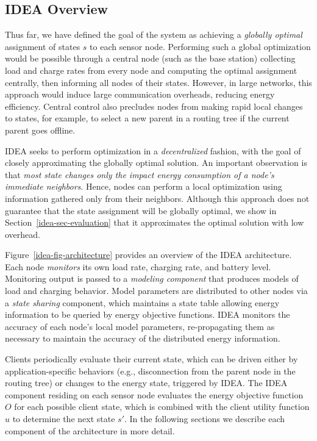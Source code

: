 \subsection{IDEA Overview}

Thus far, we have defined the goal of the system as achieving a
\textit{globally optimal} assignment of states $s$ to each sensor node.
Performing such a global optimization would be possible through a central
node (such as the base station) collecting load and charge rates from every
node and computing the optimal assignment centrally, then informing all nodes
of their states.  However, in large networks, this approach would induce
large communication overheads, reducing energy efficiency. Central control
also precludes nodes from making rapid local changes to states, for example,
to select a new parent in a routing tree if the current parent goes offline.

IDEA seeks to perform optimization in a \textit{decentralized} fashion, with
the goal of closely approximating the globally optimal solution. An important
observation is that \textit{most state changes only the impact energy
consumption of a node's immediate neighbors}. Hence, nodes can perform a
local optimization using information gathered only from their neighbors.
Although this approach does not guarantee that the state assignment will be
globally optimal, we show in Section~\ref{idea-sec-evaluation} that it
approximates the optimal solution with low overhead.

Figure~\ref{idea-fig-architecture} provides an overview of the IDEA
architecture.  Each node \textit{monitors} its own load rate, charging rate,
and battery level.  Monitoring output is passed to a \textit{modeling
component} that produces models of load and charging behavior. Model
parameters are distributed to other nodes via a \textit{state sharing}
component, which maintains a state table allowing energy information to be
queried by energy objective functions. IDEA monitors the accuracy of each
node's local model parameters, re-propagating them as necessary to maintain
the accuracy of the distributed energy information.

Clients periodically evaluate their current state, which can be driven either
by application-specific behaviors (e.g., disconnection from the parent node
in the routing tree) or changes to the energy state, triggered by IDEA. The
IDEA component residing on each sensor node evaluates the energy objective
function $O$ for each possible client state, which is combined with the
client utility function $u$ to determine the next state $s'$. In the
following sections we describe each component of the architecture in more
detail.

